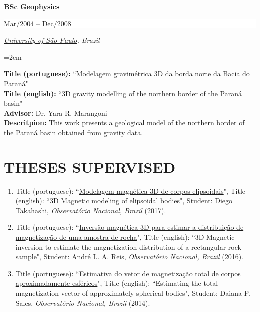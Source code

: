 \documentclass[paper=letter,fontsize=11pt]{scrartcl} %
\newcommand{\sepspace}{\vspace*{1em}}		%
\newcommand{\NewPart}[2]{\section*{\uppercase{#1} #2}}
\newcommand{\EducationEntry}[4]{
		\noindent \textbf{#1} \hfill      %
		\colorbox{White}{%
			\parbox{10em}{%
			\hfill\color{Black}#2}} \par  %
		\noindent \textit{#3} \par        %
		\noindent\hangindent=2em\hangafter=0 \small #4 %
		\normalsize \par}
\newcommand{\ThesisEntry}[6]{
		\noindent [#1] Title (portuguese): ``#2", Title (english): ``#3", Student: #4, \textit{#5} (#6).}
\begin{document}
\sepspace

\EducationEntry{\Large BSc Geophysics}{\begin{flushright} Mar/2004 -- Dec/2008 \end{flushright} \vspace{-0.2in}}{\href{http://www.iag.usp.br/international/}{University of S\~{a}o Paulo}, Brazil}

\sepspace \noindent
\textbf{Title (portuguese):} ``Modelagem gravim\'{e}trica 3D da borda norte da Bacia do Paran\'{a}" \\
\textbf{Title (english):} ``3D gravity modelling of the northern border of the Paran\'{a} basin" \\
\textbf{Advisor:} Dr. Yara R. Marangoni \\
\textbf{Descritpion:} This work presents a geological model of the northern border of the Paran\'{a} basin obtained from gravity data.

\sepspace


\renewcommand{\refname}{PEER-REVIEWED JOURNAL PAPERS (\href{http://orcid.org/0000-0002-6338-4086}{ORCID})}
\nocite{*}



\sepspace

\renewcommand{\refname}{INTERNATIONAL CONFERENCES}
\nocite{*}



\sepspace

\NewPart{Theses Supervised}{}

\begin{enumerate}

\item\ThesisEntry{MSc}{\href{http://www.pinga-lab.org/thesis/takahashi-msc.html}{Modelagem magn\'{e}tica 3D de corpos elipsoidais}}{3D Magnetic modeling of elipsoidal bodies}{Diego Takahashi}{Observat\'{o}rio Nacional, Brazil}{2017}

\item\ThesisEntry{MSc}{\href{http://www.pinga-lab.org/thesis/andre-msc.html}{Invers\~{a}o magn\'{e}tica 3D para estimar a distribui\c{c}\~{a}o de magnetiza\c{c}\~{a}o de uma amostra de rocha}}{3D Magnetic inversion to estimate the magnetization distribution of a rectangular rock sample}{Andr\'{e} L. A. Reis}{Observat\'{o}rio Nacional, Brazil}{2016}

\item\ThesisEntry{MSc}{\href{http://www.pinga-lab.org/thesis/daiana-msc.html}{Estimativa do vetor de magnetiza\c{c}\~{a}o total de corpos aproximadamente esf\'{e}ricos}}{Estimating the total magnetization vector of approximately spherical bodies}{Daiana P. Sales}{Observat\'{o}rio Nacional, Brazil}{2014}

\end{enumerate}
\end{document}
